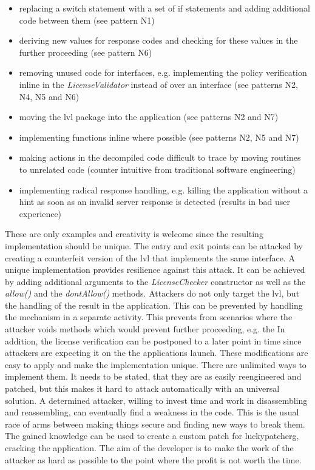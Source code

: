 \begin{itemize}
\item replacing a switch statement with a set of if statements and adding additional code between them (see pattern N1)
\item deriving new values for response codes and checking for these values in the further proceeding (see pattern N6)
\item removing unused code for interfaces, e.g. implementing the policy verification inline in the \textit{LicenseValidator} instead of over an interface (see patterns N2, N4, N5 and N6)
\item moving the \gls{lvl} package into the application (see patterns N2 and N7)
\item implementing functions inline where possible (see patterns N2, N5 and N7)
\item making actions in the decompiled code difficult to trace by moving routines to unrelated code (counter intuitive from traditional software engineering)
\item implementing radical response handling, e.g. killing the application without a hint as soon as an invalid server response is detected (results in bad user experience)
\end{itemize}
These are only examples and creativity is welcome since the resulting implementation should be unique. \cite{developersSecuring}
\newline
The entry and exit points can be attacked by creating a counterfeit version of the \gls{lvl} that implements the same interface.
A unique implementation provides resilience against this attack.
It can be achieved by adding additional arguments to the \textit{LicenseChecker} constructor as well as the \textit{allow()} and the \textit{dontAllow()} methods. \cite{developersSecuring}
\newline
Attackers do not only target the \gls{lvl}, but the handling of the result in the application.
This can be prevented by handling the mechanism in a separate activity.
This prevents from scenarios where the attacker voids methods which would prevent further proceeding, e.g. the
In addition, the license verification can be postponed to a later point in time since attackers are expecting it on the the applications launch. \cite{developersSecuring}
\newline
These modifications are easy to apply and make the implementation unique.
There are unlimited ways to implement them.
It needs to be stated, that they are as easily reengineered and patched, but this makes it hard to attack automatically with an universal solution.
A determined attacker, willing to invest time and work in disassembling and reassembling, can eventually find a weakness in the code.
This is the usual race of arms between making things secure and finding new ways to break them.
The gained knowledge can be used to create a custom patch for \gls{luckypatcherg}, cracking the application.
The aim of the developer is to make the work of the attacker as hard as possible to the point where the profit is not worth the time. \cite{developersSecuring}

